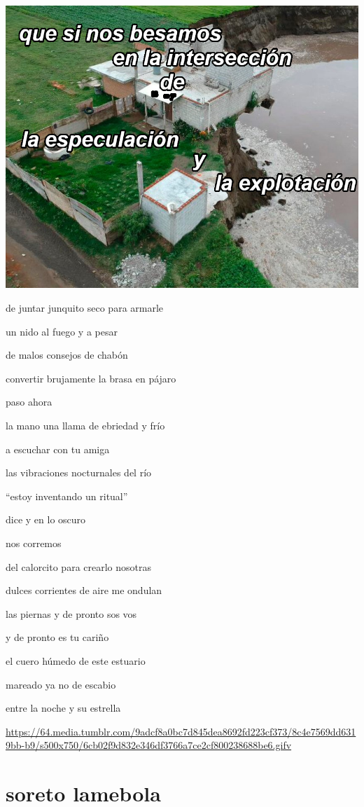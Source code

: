 \documentclass[
]{book}
\begin{document}
\includegraphics{images/8.png}

de juntar junquito seco para armarle

un nido al fuego y a pesar

de malos consejos de chabón

convertir brujamente la brasa en pájaro

paso ahora

la mano una llama de ebriedad y frío

a escuchar con tu amiga

las vibraciones nocturnales del río

``estoy inventando un ritual''

dice y en lo oscuro

nos corremos

del calorcito para crearlo nosotras

dulces corrientes de aire me ondulan

las piernas y de pronto sos vos

y de pronto es tu cariño

el cuero húmedo de este estuario

mareado ya no de escabio

entre la noche y su estrella

\url{https://64.media.tumblr.com/9adcf8a0bc7d845dea8692fd223cf373/8c4e7569dd6319bb-b9/s500x750/6cb02f9d832e346df3766a7ce2cf800238688be6.gifv}

\hypertarget{soreto-lamebola}{%
\chapter{soreto lamebola}\label{soreto-lamebola}}
\end{document}
